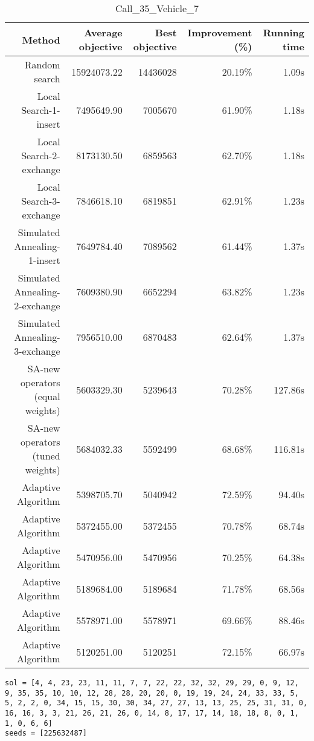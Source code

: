 \begin{table}[ht]
\centering
\caption{Call\_35\_Vehicle\_7}
\label{tab:call35vehicle7}
\begin{tabular}{|r|r|r|r|r|}
Method & Average objective & Best objective & Improvement (\%) & Running time \\
\hline
Random search & 15924073.22 & 14436028 & 20.19\% & 1.09s\\
Local Search-1-insert & 7495649.90 & 7005670 & 61.90\% & 1.18s\\
Local Search-2-exchange & 8173130.50 & 6859563 & 62.70\% & 1.18s\\
Local Search-3-exchange & 7846618.10 & 6819851 & 62.91\% & 1.23s\\
Simulated Annealing-1-insert & 7649784.40 & 7089562 & 61.44\% & 1.37s\\
Simulated Annealing-2-exchange & 7609380.90 & 6652294 & 63.82\% & 1.23s\\
Simulated Annealing-3-exchange & 7956510.00 & 6870483 & 62.64\% & 1.37s\\
SA-new operators (equal weights) & 5603329.30 & 5239643 & 70.28\% & 127.86s\\
SA-new operators (tuned weights) & 5684032.33 & 5592499 & 68.68\% & 116.81s\\
Adaptive Algorithm & 5398705.70 & 5040942 & 72.59\% & 94.40s\\
Adaptive Algorithm & 5372455.00 & 5372455 & 70.78\% & 68.74s\\
Adaptive Algorithm & 5470956.00 & 5470956 & 70.25\% & 64.38s\\
Adaptive Algorithm & 5189684.00 & 5189684 & 71.78\% & 68.56s\\
Adaptive Algorithm & 5578971.00 & 5578971 & 69.66\% & 88.46s\\
Adaptive Algorithm & 5120251.00 & 5120251 & 72.15\% & 66.97s\\
\end{tabular}%
\end{table}
\begin{lstlisting}[label={lst:call35vehicle7},caption=Optimal solution call\_35\_vehicle\_7]
sol = [4, 4, 23, 23, 11, 11, 7, 7, 22, 22, 32, 32, 29, 29, 0, 9, 12, 9, 35, 35, 10, 10, 12, 28, 28, 20, 20, 0, 19, 19, 24, 24, 33, 33, 5, 5, 2, 2, 0, 34, 15, 15, 30, 30, 34, 27, 27, 13, 13, 25, 25, 31, 31, 0, 16, 16, 3, 3, 21, 26, 21, 26, 0, 14, 8, 17, 17, 14, 18, 18, 8, 0, 1, 1, 0, 6, 6]
seeds = [225632487]
\end{lstlisting}%
\clearpage


